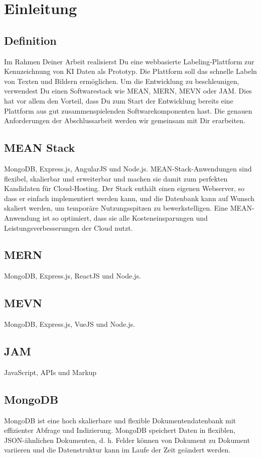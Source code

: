 \chapter{Einleitung} \label{sec:definition}
\section{Definition}
Im Rahmen Deiner Arbeit realisierst Du eine webbasierte Labeling-Plattform zur Kennzeichnung von KI Daten als Prototyp. Die Plattform soll das schnelle Labeln von Texten und Bildern ermöglichen. Um die Entwicklung zu beschleunigen, verwendest Du einen Softwarestack wie MEAN, MERN, MEVN oder JAM. Dies hat vor allem den Vorteil, dass Du zum Start der Entwicklung bereits eine Plattform aus gut zusammenspielenden Softwarekomponenten hast. Die genauen Anforderungen der Abschlussarbeit werden wir gemeinsam mit Dir erarbeiten.

\section{MEAN Stack}
MongoDB, Express.js, AngularJS und Node.js.
MEAN-Stack-Anwendungen sind flexibel, skalierbar und erweiterbar und machen sie damit zum perfekten Kandidaten für Cloud-Hosting. Der Stack enthält einen eigenen Webserver, so dass er einfach implementiert werden kann, und die Datenbank kann auf Wunsch skaliert werden, um temporäre Nutzungsspitzen zu bewerkstelligen. Eine MEAN-Anwendung ist so optimiert, dass sie alle Kosteneinsparungen und Leistungsverbesserungen der Cloud nutzt.

\section{MERN}
MongoDB, Express.js, ReactJS und Node.js.

\section{MEVN}
MongoDB, Express.js, VueJS und Node.js.

\section{JAM}
JavaScript, APIs und Markup

\section{MongoDB}
MongoDB ist eine hoch skalierbare und flexible Dokumentendatenbank mit effizienter Abfrage und Indizierung. MongoDB speichert Daten in flexiblen, JSON-ähnlichen Dokumenten, d. h. Felder können von Dokument zu Dokument variieren und die Datenstruktur kann im Laufe der Zeit geändert werden.

